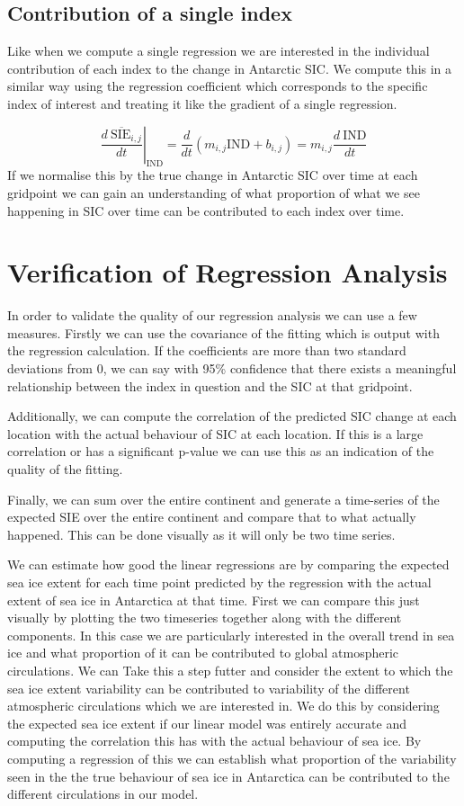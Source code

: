 \documentclass[../main.tex]{subfiles}
\begin{document}
\subsection{Contribution of a single index}
Like when we compute a single regression we are interested in the individual contribution of each index to the change in Antarctic SIC. We compute this in a similar way using the regression coefficient which corresponds to the specific index of interest and treating it like the gradient of a single regression.

$$
\left. \overline{\frac{d\  \text{SIE}_{i,j}}{dt}}\right|_{\text{IND}} = \frac{d}{dt} \left(m_{i,j}  \text{IND} + b_{i,j}\right) = m_{i,j}  \frac{d\ \text{IND}}{dt}
$$
 If we normalise this by the true change in Antarctic SIC over time at each gridpoint we can gain an understanding of what proportion of what we see happening in SIC over time can be contributed to each index over time.
 
\section{Verification of Regression Analysis}

In order to validate the quality of our regression analysis we can use a few measures. Firstly we can use the covariance of the fitting which is output with the regression calculation. If the coefficients are more than two standard deviations from 0, we can say with 95\% confidence that there exists a meaningful relationship between the index in question and the SIC at that gridpoint. 

Additionally, we can compute the correlation of the predicted SIC change at each location with the actual behaviour of SIC at each location. If this is a large correlation or has a significant p-value we can use this as an indication of the quality of the fitting.

Finally, we can sum over the entire continent and generate a time-series of the expected SIE over the entire continent and compare that to what actually happened. This can be done visually as it will only be two time series. 

We can estimate how good the linear regressions are by comparing the expected sea ice extent for each time point predicted by the regression with the actual extent of sea ice in Antarctica at that time. First we can compare this just visually by plotting the two timeseries together along with the different components. In this case we are particularly interested in the overall trend in sea ice and what proportion of it can be contributed to global atmospheric circulations. We can Take this a step futter and consider the extent to which the sea ice extent variability can be contributed to variability of the different atmospheric circulations which we are interested in. We do this by considering the expected sea ice extent if our linear model was entirely accurate and computing the correlation this has with the actual behaviour of sea ice. By computing a regression of this we can establish what proportion of the variability seen in the the true behaviour of sea ice in Antarctica can be contributed to the different circulations in our model.
\end{document}
